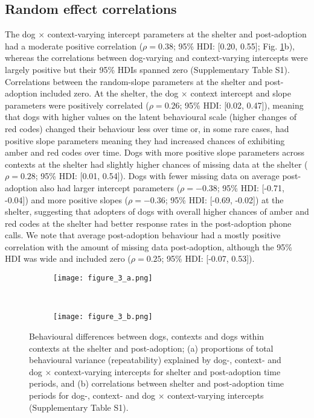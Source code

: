 \documentclass[12pt]{article}
\begin{document}
\subsection{Random effect correlations}
The dog $\times$ context-varying intercept parameters at the shelter and post-adoption had a moderate positive correlation ($\rho = 0.38$; 95\% HDI: [0.20, 0.55]; Fig. \ref{fig_corrs_rept}b), whereas the correlations between dog-varying and context-varying intercepts were largely positive but their 95\% HDIs spanned zero (Supplementary Table S1). Correlations between the random-slope parameters at the shelter and post-adoption included zero. At the shelter, the dog $\times$ context intercept and slope parameters were positively correlated ($\rho = 0.26$; 95\% HDI: [0.02, 0.47]), meaning that dogs with higher values on the latent behavioural scale (higher changes of red codes) changed their behaviour less over time or, in some rare cases, had positive slope parameters meaning they had increased chances of exhibiting amber and red codes over time. Dogs with more positive slope parameters across contexts at the shelter had slightly higher chances of missing data at the shelter ($\rho = 0.28$; 95\% HDI: [0.01, 0.54]). Dogs with fewer missing data on average post-adoption also had larger intercept parameters ($\rho = -0.38$; 95\% HDI: [-0.71, -0.04]) and more positive slopes ($\rho = -0.36$; 95\% HDI: [-0.69, -0.02]) at the shelter, suggesting that adopters of dogs with overall higher chances of amber and red codes at the shelter had better response rates in the post-adoption phone calls. We note that average post-adoption behaviour had a mostly positive correlation with the amount of missing data post-adoption, although the 95\% HDI was wide and included zero ($\rho = 0.25$; 95\% HDI: [-0.07, 0.53]).

\begin{figure}[t!]
  \centering
  \begin{subfigure}{0.5\textwidth}
    \centering
    \texttt{[image: figure\_3\_a.png]}
  \end{subfigure}%
  ~
  \begin{subfigure}{0.5\textwidth}
    \centering
    \texttt{[image: figure\_3\_b.png]}
  \end{subfigure}
  \caption{Behavioural differences between dogs, contexts and dogs within contexts at the shelter and post-adoption; (a) proportions of total behavioural variance (repeatability) explained by dog-, context- and dog $\times$ context-varying intercepts for shelter and post-adoption time periods, and (b) correlations between shelter and post-adoption time periods for dog-, context- and dog $\times$ context-varying intercepts (Supplementary Table S1).}
  \label{fig_corrs_rept}
\end{figure}
\end{document}
